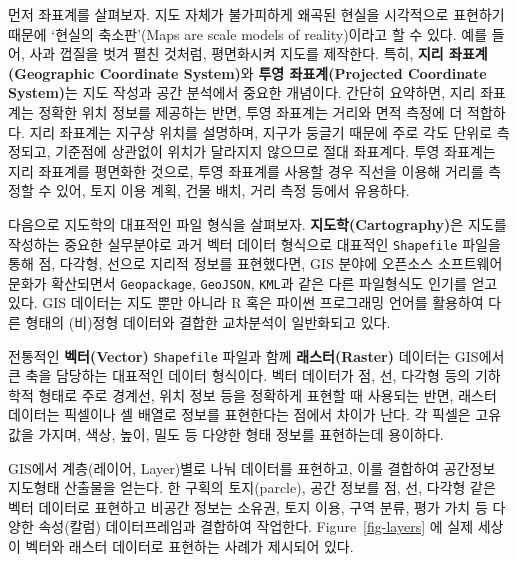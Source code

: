 \documentclass[
  a4paper,showtrims,openright,hidelinks]{oblivoir}
\begin{document}
먼저 좌표계를 살펴보자. 지도 자체가 불가피하게 왜곡된 현실을 시각적으로
표현하기 때문에 `현실의 축소판'(Maps are scale models of reality)이라고
할 수 있다. 예를 들어, 사과 껍질을 벗겨 펼친 것처럼, 평면화시켜 지도를
제작한다. 특히, \textbf{지리 좌표계(Geographic Coordinate System)}와
\textbf{투영 좌표계(Projected Coordinate System)}는 지도 작성과 공간
분석에서 중요한 개념이다. 간단히 요약하면, 지리 좌표계는 정확한 위치
정보를 제공하는 반면, 투영 좌표계는 거리와 면적 측정에 더 적합하다. 지리
좌표계는 지구상 위치를 설명하며, 지구가 둥글기 때문에 주로 각도 단위로
측정되고, 기준점에 상관없이 위치가 달라지지 않으므로 절대 좌표계다. 투영
좌표계는 지리 좌표계를 평면화한 것으로, 투영 좌표계를 사용할 경우 직선을
이용해 거리를 측정할 수 있어, 토지 이용 계획, 건물 배치, 거리 측정
등에서 유용하다. \autocite{lovelace2019geocomputation}

다음으로 지도학의 대표적인 파일 형식을 살펴보자.
\textbf{지도학(Cartography)}은 지도를 작성하는 중요한 실무분야로 과거
벡터 데이터 형식으로 대표적인 \texttt{Shapefile} 파일을 통해 점, 다각형,
선으로 지리적 정보를 표현했다면, GIS 분야에 오픈소스 소프트웨어 문화가
확산되면서 \texttt{Geopackage}, \texttt{GeoJSON}, \texttt{KML}과 같은
다른 파일형식도 인기를 얻고 있다. GIS 데이터는 지도 뿐만 아니라 R 혹은
파이썬 프로그래밍 언어를 활용하여 다른 형태의 (비)정형 데이터와 결합한
교차분석이 일반화되고 있다.

전통적인 \textbf{벡터(Vector)} \texttt{Shapefile} 파일과 함께
\textbf{래스터(Raster)} 데이터는 GIS에서 큰 축을 담당하는 대표적인
데이터 형식이다. 벡터 데이터가 점, 선, 다각형 등의 기하학적 형태로 주로
경계선, 위치 정보 등을 정확하게 표현할 때 사용되는 반면, 래스터 데이터는
픽셀이나 셀 배열로 정보를 표현한다는 점에서 차이가 난다. 각 픽셀은
고유값을 가지며, 색상, 높이, 밀도 등 다양한 형태 정보를 표현하는데
용이하다.

GIS에서 계층(레이어, Layer)별로 나눠 데이터를 표현하고, 이를 결합하여
공간정보 지도형태 산출물을 얻는다. 한 구획의 토지(parcle), 공간 정보를
점, 선, 다각형 같은 벡터 데이터로 표현하고 비공간 정보는 소유권, 토지
이용, 구역 분류, 평가 가치 등 다양한 속성(칼럼) 데이터프레임과 결합하여
작업한다. Figure~\ref{fig-layers} 에 실제 세상이 벡터와 래스터 데이터로
표현하는 사례가 제시되어 있다.
\end{document}
